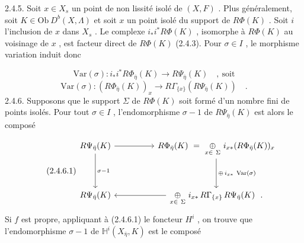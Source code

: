 
2.4.5. Soit $x \in X_s$ un point de non lissité isolé de $(X, F)$ . Plus généralement, soit $K \in \mathrm{Ob}\ D^b(X, \Lambda)$ et soit $x$ un point isolé du support de $R\Phi(K)$ . Soit $i$ l'inclusion de $x$ dans $X_s$ . Le complexe $i_*i^* R\Phi(K)$ , isomorphe à $R\Phi(K)$ au voisinage de $x$ , est facteur direct de $R\Phi(K)$ (2.4.3). Pour $\sigma \in I$ , le morphisme variation induit donc

\begin{equation*}
\mathrm{Var}(\sigma) : i_*i^* R\Phi_{\bar\eta}(K) \longrightarrow R\Psi_{\bar\eta}(K) \quad , \ \text{soit}
\end{equation*}
\begin{equation}\tag{2.4.5.1}
\mathrm{Var}(\sigma) : (R\Phi_{\bar\eta}(K))_x \longrightarrow R\Gamma_{\{x\}}(R\Psi_{\bar\eta}(K)) \quad .
\end{equation}
2.4.6. Supposons que le support $\Sigma$ de $R\Phi(K)$ soit formé d'un nombre fini de points isolés. Pour tout $\sigma \in I$ , l'endomorphisme $\sigma - 1$ de $R\Psi_{\bar\eta}(K)$ est alors le composé

\begin{equation}\tag{2.4.6.1}
\begin{tikzcd}[column sep=huge, row sep=huge]
R\Psi_{\bar\eta}(K) \arrow[r] \arrow[d, "\sigma-1"] & R\Phi_{\bar\eta}(K) \ =\ \underset{x\in\ \Sigma}{\oplus}\ i_{x*}(R\Phi_{\bar\eta}(K))_x \arrow[d, "{\oplus\, i_{x*}\ \mathrm{Var}(\sigma)}"] \\
R\Psi_{\bar\eta}(K) & \underset{x\in\ \Sigma}{\oplus}\ i_{x*}\, R\Gamma_{\{x\}}\, R\Psi_{\bar\eta}(K)\ \ . \arrow[l]
\end{tikzcd}
\end{equation}
Si $f$ est propre, appliquant à (2.4.6.1) le foncteur $H^i$ , on trouve que l'endomorphisme $\sigma-1$ de $\mathbb{H}^i(X_{\bar\eta}, K)$ est le composé

